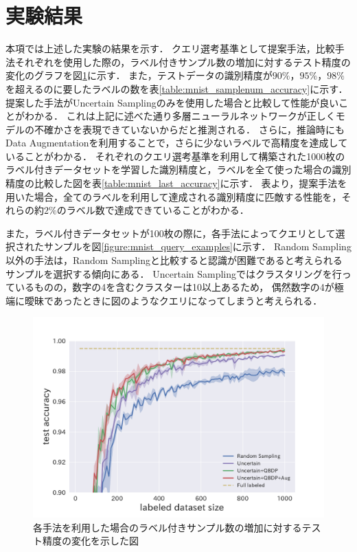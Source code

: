 \section{実験結果}
本項では上述した実験の結果を示す．
クエリ選考基準として提案手法，比較手法それぞれを使用した際の，ラベル付きサンプル数の増加に対するテスト精度の変化のグラフを図\ref{fig:mnist_acc_graph}に示す．
また，テストデータの識別精度が$90\%$，$95\%$，$98\%$を超えるのに要したラベルの数を表\ref{table:mnist_samplenum_accuracy}に示す．
提案した手法がUncertain Samplingのみを使用した場合と比較して性能が良いことがわかる．
これは上記に述べた通り多層ニューラルネットワークが正しくモデルの不確かさを表現できていないからだと推測される．
さらに，推論時にもData Augmentationを利用することで，さらに少ないラベルで高精度を達成していることがわかる．
それぞれのクエリ選考基準を利用して構築された1000枚のラベル付きデータセットを学習した識別精度と，ラベルを全て使った場合の識別精度の比較した図を表\ref{table:mnist_last_accuracy}に示す．
表より，提案手法を用いた場合，全てのラベルを利用して達成される識別精度に匹敵する性能を，それらの約$2\%$のラベル数で達成できていることがわかる．

また，ラベル付きデータセットが100枚の際に，各手法によってクエリとして選択されたサンプルを図\ref{figure:mnist_query_examples}に示す．
Random Sampling以外の手法は，Random Samplingと比較すると認識が困難であると考えられるサンプルを選択する傾向にある．
Uncertain Samplingではクラスタリングを行っているものの，数字の4を含むクラスターは10以上あるため，
偶然数字の4が極端に曖昧であったときに図のようなクエリになってしまうと考えられる．


\begin{figure}[h]
     \begin{center}
      \includegraphics[width=12cm]{figures/mnist_acc_graph.pdf}
     \end{center}
    \caption{\label{fig:mnist_acc_graph}各手法を利用した場合のラベル付きサンプル数の増加に対するテスト精度の変化を示した図}
\end{figure}

